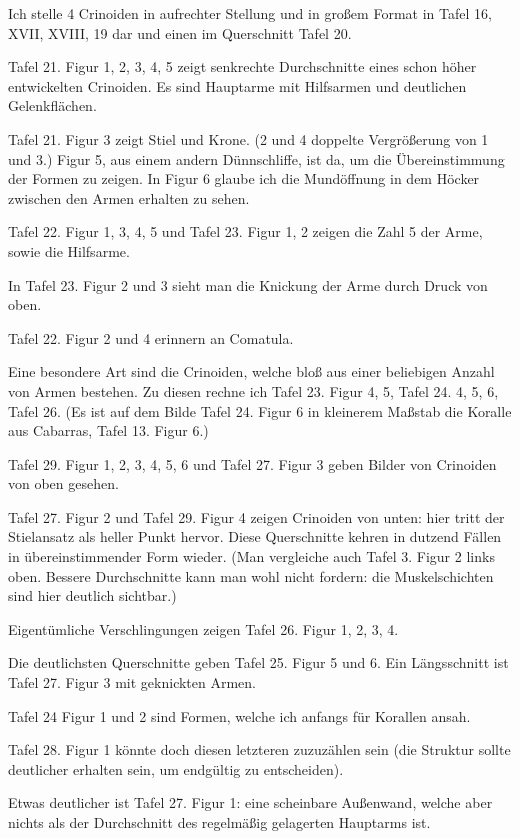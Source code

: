 \documentclass[a4paper, 12pt, oneside]{article}
\begin{document}
Ich stelle 4 Crinoiden in aufrechter Stellung und in großem Format in Tafel 16, XVII, XVIII, 19 dar und einen im Querschnitt Tafel 20.

Tafel 21. Figur 1, 2, 3, 4, 5 zeigt senkrechte Durchschnitte eines schon höher entwickelten Crinoiden. Es sind Hauptarme mit Hilfsarmen und deutlichen Gelenkflächen.

Tafel 21. Figur 3 zeigt Stiel und Krone. (2 und 4 doppelte Vergrößerung von 1 und 3.) Figur 5, aus einem andern Dünnschliffe, ist da, um die Übereinstimmung der Formen zu zeigen. In Figur 6 glaube ich die Mundöffnung in dem Höcker zwischen den Armen erhalten zu sehen.

Tafel 22. Figur 1, 3, 4, 5 und Tafel 23. Figur 1, 2 zeigen die Zahl 5 der Arme, sowie die Hilfsarme.

In Tafel 23. Figur 2 und 3 sieht man die Knickung der Arme durch Druck von oben.

Tafel 22. Figur 2 und 4 erinnern an Comatula.

Eine besondere Art sind die Crinoiden, welche bloß aus einer beliebigen Anzahl von Armen bestehen. Zu diesen rechne ich Tafel 23. Figur 4, 5, Tafel 24. 4, 5, 6, Tafel 26. (Es ist auf dem Bilde Tafel 24. Figur 6 in kleinerem Maßstab die Koralle aus Cabarras, Tafel 13. Figur 6.)

Tafel 29. Figur 1, 2, 3, 4, 5, 6 und Tafel 27. Figur 3 geben Bilder von Crinoiden von oben gesehen.

Tafel 27. Figur 2 und Tafel 29. Figur 4 zeigen Crinoiden von unten: hier tritt der Stielansatz als heller Punkt hervor. Diese Querschnitte kehren in dutzend Fällen in übereinstimmender Form wieder. (Man vergleiche auch Tafel 3. Figur 2 links oben. Bessere Durchschnitte kann man wohl nicht fordern: die Muskelschichten sind hier deutlich sichtbar.)

Eigentümliche Verschlingungen zeigen Tafel 26. Figur 1, 2, 3, 4.

Die deutlichsten Querschnitte geben Tafel 25. Figur 5 und 6. Ein Längsschnitt ist Tafel 27. Figur 3 mit geknickten Armen.

Tafel 24 Figur 1 und 2 sind Formen, welche ich anfangs für Korallen ansah.

Tafel 28. Figur 1 könnte doch diesen letzteren zuzuzählen sein (die Struktur sollte deutlicher erhalten sein, um endgültig zu entscheiden).

Etwas deutlicher ist Tafel 27. Figur 1: eine scheinbare Außenwand, welche aber nichts als der Durchschnitt des regelmäßig gelagerten Hauptarms ist.
\end{document}
